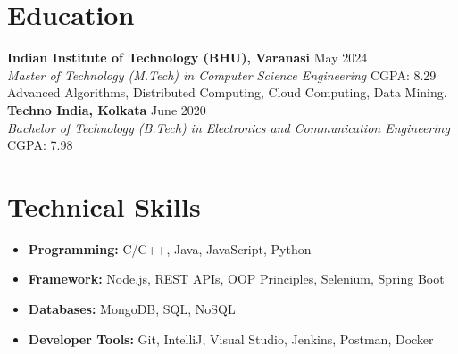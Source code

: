\documentclass[a4paper,10pt]{article}
\begin{document}
\vspace{-1em}
\section*{Education}
\textbf{Indian Institute of Technology (BHU), Varanasi} \hfill May 2024 \\
\textit{Master of Technology (M.Tech) in Computer Science Engineering} \hfill CGPA: 8.29\\
Advanced Algorithms, Distributed Computing, Cloud Computing, Data Mining.\\
\textbf{Techno India, Kolkata} \hfill June 2020 \\
\textit{Bachelor of Technology (B.Tech) in Electronics and Communication Engineering} \hfill CGPA: 7.98\\

\vspace{-1em}
\section*{Technical Skills}
    \begin{itemize}[noitemsep,topsep=0pt]
        \item\textbf{Programming:} C/C++, Java, JavaScript, Python
        \item \textbf{Framework:} Node.js, REST APIs, OOP Principles, Selenium, Spring Boot
        \item \textbf{Databases:} MongoDB, SQL, NoSQL
        \item \textbf{Developer Tools:} Git, IntelliJ, Visual Studio, Jenkins, Postman, Docker
    \end{itemize}

\vspace{-1em}
\end{document}

